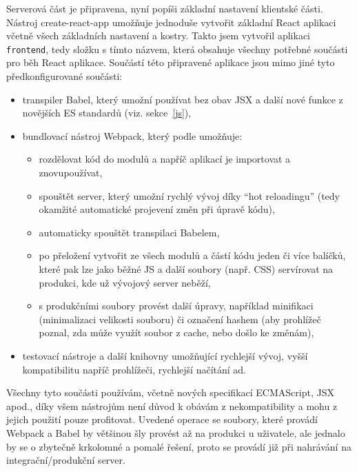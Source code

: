     Serverová část je připravena, nyní popíši základní nastavení klientské části. Nástroj create-react-app umožňuje jednoduše vytvořit základní React aplikaci včetně všech základních nastavení a kostry. Takto jsem vytvořil aplikaci \verb|frontend|, tedy složku s tímto názvem, která obsahuje všechny potřebné součásti pro běh React aplikace. Součástí této připravené aplikace jsou mimo jiné tyto předkonfigurované součásti:
    \begin{itemize}
        \item transpiler Babel, který umožní používat bez obav JSX a další nové funkce z novějších ES standardů (viz. sekce~\ref{js}),
        \item bundlovací nástroj Webpack, který podle \cite{webpack-ackee} umožňuje:
            \begin{itemize}
                \item rozdělovat kód do modulů a napříč aplikací je importovat a znovupoužívat,
                \item spouštět server, který umožní rychlý vývoj díky \enquote{hot reloadingu} (tedy okamžité automatické projevení změn při úpravě kódu),
                \item automaticky spouštět transpilaci Babelem,
                \item po přeložení vytvořit ze všech modulů a částí kódu jeden či více balíčků, které pak lze jako běžné JS a další soubory (např. CSS) servírovat na produkci, kde už vývojový server neběží,
                \item s produkčními soubory provést další úpravy, například minifikaci (minimalizaci velikosti souboru) či označení hashem (aby prohlížeč poznal, zda může využít soubor z cache, nebo došlo ke změnám),
            \end{itemize}
        \item testovací nástroje a další knihovny umožňující rychlejší vývoj, vyšší kompatibilitu napříč prohlížeči, rychlejší načítání ad.
    \end{itemize}
    Všechny tyto součásti používám, včetně nových specifikací ECMAScript, JSX apod., díky všem nástrojům není důvod k obávám z nekompatibility a mohu z jejich použití pouze profitovat. Uvedené operace se soubory, které provádí Webpack a Babel by většinou šly provést až na produkci u uživatele, ale jednalo by se o zbytečně krkolomné a pomalé řešení, proto se provádí již při nahrávání na integrační/produkční server.
    
